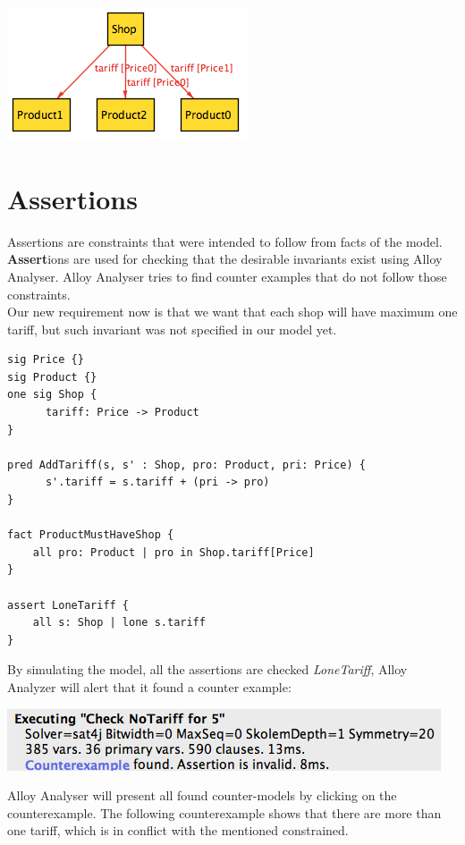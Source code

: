 \documentclass[oneside]{book}
\begin{document}
\begin{center}
\includegraphics[scale=0.6]{shop5}
\end{center}

\newpage

\section{Assertions}
Assertions are constraints that were intended to follow from facts of the model. \textbf{Assert}ions are used for checking that the desirable invariants exist using Alloy Analyser. Alloy Analyser tries to find counter examples that do not follow those constraints.\\

Our new requirement now is that we want that each shop will have maximum one tariff, but such invariant was not specified in our model yet.

\begin{lstlisting}
sig Price {}
sig Product {}
one sig Shop {
	  tariff: Price -> Product
}

pred AddTariff(s, s' : Shop, pro: Product, pri: Price) {
	  s'.tariff = s.tariff + (pri -> pro)
}

fact ProductMustHaveShop {
	all pro: Product | pro in Shop.tariff[Price]
}

assert LoneTariff {
	all s: Shop | lone s.tariff
}
\end{lstlisting}

By simulating the model, all the assertions are checked \textit{LoneTariff}, Alloy Analyzer will alert that it found a counter example:

\begin{center}
\includegraphics[scale=0.6]{counterexample}
\end{center}

Alloy Analyser will present all found counter-models by clicking on the counterexample. The following counterexample shows that there are more than one tariff, which is in conflict with the mentioned constrained. 
\end{document}

